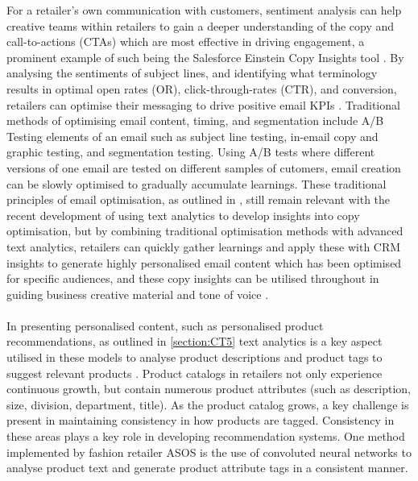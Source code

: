 \documentclass[11pt]{article}
\theoremstyle{plain}
\theoremstyle{definition}
\begin{document}
For a retailer's own communication with customers, sentiment analysis can help creative teams within retailers to gain a deeper understanding of the copy and call-to-actions (CTAs) which are most effective in driving engagement, a prominent example of such being the Salesforce Einstein Copy Insights tool \cite{copy-insights}. By analysing the sentiments of subject lines, and identifying what terminology results in optimal open rates (OR), click-through-rates (CTR), and conversion, retailers can optimise their messaging to drive positive email KPIs \cite{Hanna:2015aa}. Traditional methods of optimising email content, timing, and segmentation include A/B Testing elements of an email such as subject line testing, in-email copy and graphic testing, and segmentation testing. Using A/B tests where different versions of one email are tested on different samples of cutomers, email creation can be slowly optimised to gradually accumulate learnings. These traditional principles of email optimisation, as outlined in \cite{HannaIn:2015aa}, still remain relevant with the recent development of using text analytics to develop insights into copy optimisation, but by combining traditional optimisation methods with advanced text analytics, retailers can quickly gather learnings and apply these with CRM insights to generate highly personalised email content which has been optimised for specific audiences, and these copy insights can be utilised throughout in guiding business creative material and tone of voice \cite{Artun:2015aa}. \\
\\
In presenting personalised content, such as personalised product recommendations, as outlined in \ref{section:CT5} text analytics is a key aspect utilised in these models to analyse product descriptions and product tags to suggest relevant products \cite{Guan:2019aa}. Product catalogs in retailers not only experience continuous growth, but contain numerous product attributes (such as description, size, division, department, title). As the product catalog grows, a key challenge is present in maintaining consistency in how products are tagged. Consistency in these areas plays a key role in developing recommendation systems. One method implemented by fashion retailer ASOS is the use of convoluted neural networks to analyse product text and generate product attribute tags in a consistent manner\cite{cardoso2018product}.\\
\\
\end{document}
